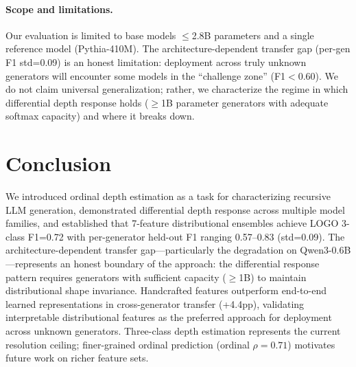 \documentclass[11pt,a4paper]{article}
\begin{document}
\paragraph{Scope and limitations.} Our evaluation is limited to base models ${\leq}$2.8B parameters and a single reference model (Pythia-410M). The architecture-dependent transfer gap (per-gen F1 std=0.09) is an honest limitation: deployment across truly unknown generators will encounter some models in the ``challenge zone'' (F1$<$0.60). We do not claim universal generalization; rather, we characterize the regime in which differential depth response holds (${\geq}$1B parameter generators with adequate softmax capacity) and where it breaks down.

\section{Conclusion}

We introduced ordinal depth estimation as a task for characterizing recursive LLM generation, demonstrated differential depth response across multiple model families, and established that 7-feature distributional ensembles achieve LOGO 3-class F1=0.72 with per-generator held-out F1 ranging 0.57--0.83 (std=0.09). The architecture-dependent transfer gap---particularly the degradation on Qwen3-0.6B---represents an honest boundary of the approach: the differential response pattern requires generators with sufficient capacity (${\geq}$1B) to maintain distributional shape invariance. Handcrafted features outperform end-to-end learned representations in cross-generator transfer (+4.4pp), validating interpretable distributional features as the preferred approach for deployment across unknown generators. Three-class depth estimation represents the current resolution ceiling; finer-grained ordinal prediction (ordinal $\rho{=}0.71$) motivates future work on richer feature sets.
\end{document}
